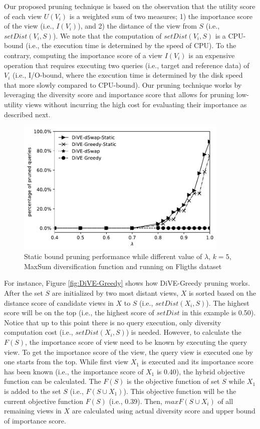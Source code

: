 \documentclass{article}
\begin{document}
Our proposed pruning technique is based on the observation that the utility score of each view $U(V_i)$ is a weighted sum of two measures; 1) the importance score of the view (i.e., $I(V_i)$), and 2) the distance of the view from $S$ (i.e., $setDist(V_i, S) $). 
%
We note that the computation of $setDist(V_i, S)$ is a CPU-bound (i.e., the execution time is determined by the speed of CPU). 
%
To the contrary, computing the importance score of a view $I(V_i)$ is an expensive operation that requires executing two queries (i.e., target and reference data) of $V_i$ (i.e., I/O-bound, where the execution time is determined by the disk speed that more slowly compared to CPU-bound).
%
Our pruning technique works by leveraging the diversity score and importance score that allows for pruning low-utility views without incurring the high cost for evaluating their importance as described next.
%
\begin{figure}
	\begin{center}
		\includegraphics[width=4.0in]{figures/no_pruning_vs_static_extend}
		\vspace{-12pt}
		\caption{Static bound pruning performance while different value of $\lambda$, $k = 5$, MaxSum diversification function and running on Fligths dataset}
		\label{fig:static-pruning}
		\vspace{-20pt}
	\end{center}
\end{figure}


For instance, Figure \ref{fig:DiVE-Greedy} shows how DiVE-Greedy pruning works. After the set $S$ are initialized by two most distant views, $X$ is sorted based on the distance score of candidate views in $X$ to $S$ (i.e., $ setDist(X_i, S) $). The highest score will be on the top (i.e., the highest score of $setDist$ in this example is 0.50). Notice that up to this point there is no query execution, only diversity computation cost (i.e., $ setDist(X_i, S) $) is needed. However, to calculate the $F(S)$, the importance score of view need to be known by executing the query view. To get the importance score of the view, the query view is executed one by one starts from the top. While first view $X_1$ is executed and its importance score has been known (i.e., the importance score of $X_1$ is 0.40), the hybrid objective function can be calculated. The $F(S)$ is the objective function of set $S $ while $X_1$ is added to the set $S$ (i.e., $ F(S \cup X_1) $). This objective function will be the current objective function $ F(S) $ (i.e., 0.39). Then, $ maxF(S \cup X_i) $ of all remaining views in $X$ are calculated using actual diversity score and upper bound of importance score. 
\end{document}
